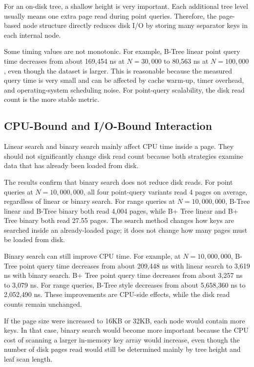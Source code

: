 \documentclass[12pt,a4paper]{article}
\begin{document}
For an on-disk tree, a shallow height is very important. Each additional tree level usually means one extra page read during point queries. Therefore, the page-based node structure directly reduces disk I/O by storing many separator keys in each internal node.

Some timing values are not monotonic. For example, B-Tree linear point query time decreases from about 169,454 ns at $N=30{,}000$ to 80,563 ns at $N=100{,}000$, even though the dataset is larger. This is reasonable because the measured query time is very small and can be affected by cache warm-up, timer overhead, and operating-system scheduling noise. For point-query scalability, the disk read count is the more stable metric.

\subsection{CPU-Bound and I/O-Bound Interaction}

Linear search and binary search mainly affect CPU time inside a page. They should not significantly change disk read count because both strategies examine data that has already been loaded from disk.

The results confirm that binary search does not reduce disk reads. For point queries at $N=10{,}000{,}000$, all four point-query variants read 4 pages on average, regardless of linear or binary search. For range queries at $N=10{,}000{,}000$, B-Tree linear and B-Tree binary both read 4,004 pages, while B+ Tree linear and B+ Tree binary both read 27.55 pages. The search method changes how keys are searched inside an already-loaded page; it does not change how many pages must be loaded from disk.

Binary search can still improve CPU time. For example, at $N=10{,}000{,}000$, B-Tree point query time decreases from about 209,448 ns with linear search to 3,619 ns with binary search. B+ Tree point query time decreases from about 3,257 ns to 3,079 ns. For range queries, B-Tree style decreases from about 5,658,360 ns to 2,052,490 ns. These improvements are CPU-side effects, while the disk read counts remain unchanged.

If the page size were increased to 16KB or 32KB, each node would contain more keys. In that case, binary search would become more important because the CPU cost of scanning a larger in-memory key array would increase, even though the number of disk pages read would still be determined mainly by tree height and leaf scan length.
\end{document}
